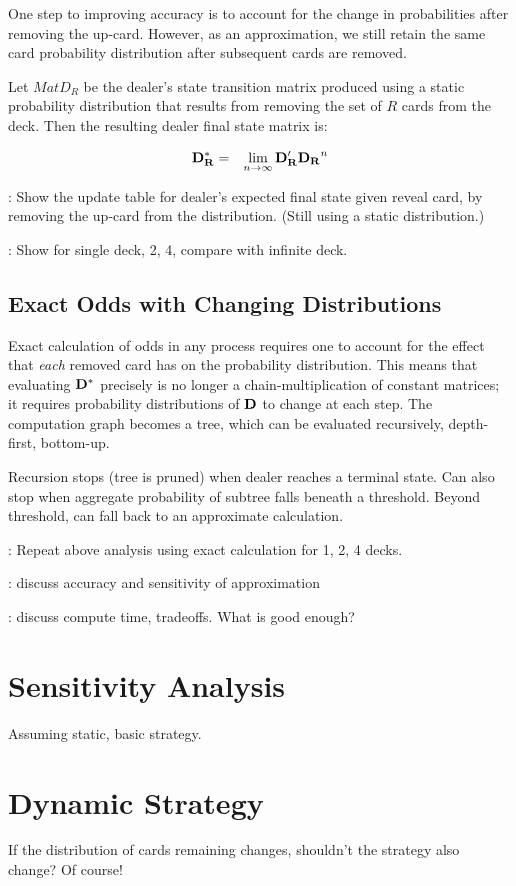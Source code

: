 One step to improving accuracy is to account for
the change in probabilities after removing the up-card.
However, as an approximation, we still retain the same 
card probability distribution after subsequent cards are removed. 

Let $Mat{D_{R}}$ be the dealer's state transition matrix produced
using a static probability distribution that results from
removing the set of $R$ cards from the deck.  
Then the resulting dealer final state matrix is:

\begin{eqnarray}
\mathbf{D_R^*} &=& \lim_{n\rightarrow{}\infty}{\mathbf{D_R^\prime}\mathbf{D_R}^n}
\end{eqnarray}

\TODO:
Show the update table for dealer's expected final state
given reveal card, by removing the up-card from the distribution.
(Still using a static distribution.)  

\TODO:
Show for single deck, 2, 4, compare with infinite deck.

\subsection{Exact Odds with Changing Distributions}
\label{sec:counting:dealer-up:exact}

Exact calculation of odds in any process requires
one to account for the effect that \emph{each} removed card has
on the probability distribution.  
This means that evaluating $\mathbf{D^*}$ precisely is no longer
a chain-multiplication of constant matrices; 
it requires probability distributions of $\mathbf{D}$ to change
at each step.
The computation graph becomes a tree, which can be evaluated
recursively, depth-first, bottom-up.

Recursion stops (tree is pruned) when
dealer reaches a terminal state.
Can also stop when aggregate probability of subtree
falls beneath a threshold.
Beyond threshold, can fall back to an approximate calculation.

\TODO:
Repeat above analysis using exact calculation for 1, 2, 4 decks.  

\TODO:
discuss accuracy and sensitivity of approximation

\TODO:
discuss compute time, tradeoffs.  What is good enough?

\section{Sensitivity Analysis}
\label{sec:counting:sensitivity}

Assuming static, basic strategy.

\section{Dynamic Strategy}
\label{sec:counting:dynamic}

If the distribution of cards remaining changes, 
shouldn't the strategy also change?
Of course!


